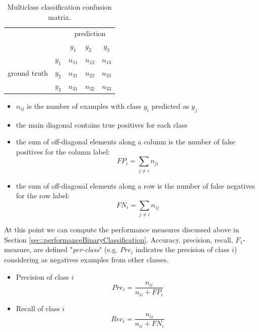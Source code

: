 \begin{table}[ht]
    \centering
    \begin{tabular}{cc|clc|}
    \cline{3-5}
     &  & \multicolumn{3}{c|}{prediction} \\ \cline{3-5} 
     &  & \multicolumn{1}{c|}{$y_1$} & \multicolumn{1}{l|}{$y_2$} & $y_3$ \\ \hline
    \multicolumn{1}{|c|}{\multirow{3}{*}{ground truth}} & $y_1$ & \multicolumn{1}{c|}{$n_{11}$} & \multicolumn{1}{l|}{$n_{12}$} & $n_{13}$ \\ \cline{2-5} 
    \multicolumn{1}{|c|}{} & \multicolumn{1}{l|}{$y_2$} & \multicolumn{1}{l|}{$n_{21}$} & \multicolumn{1}{l|}{$n_{22}$} & \multicolumn{1}{l|}{$n_{23}$} \\ \cline{2-5} 
    \multicolumn{1}{|c|}{} & $y_3$ & \multicolumn{1}{c|}{$n_{31}$} & \multicolumn{1}{l|}{$n_{32}$} & $n_{33}$ \\ \hline
    \end{tabular}
    \caption{Multiclass classification confusion matrix.}
    \label{fig:confisionMatrixMulticlassClassification}
\end{table}


\begin{itemize}
    \item $n_{ij}$ is the number of examples with class $y_i$ predicted as $y_j$
    \item the main diagonal contains true positives for each class
    \item the sum of off-diagonal elements along a column is the number of false positives for the column label:
    $$\mathit{FP}_i = \sum_{j \neq i} n_{ji}$$
    \item the sum of off-diagonal elements along a row is the number of false negatives for the row label:
    $$\mathit{FN}_i = \sum_{j \neq i} n_{ij}$$
\end{itemize}

At this point we can compute the performance measures discussed above in Section \ref{sec::performanceBinaryClassification}. Accuracy, precision, recall, $F_1$-measure, are defined "\textit{per-class}" (e.g. $\mathit{Pre}_i$ indicates the precision of class $i$) considering as negatives examples from other classes.
\begin{itemize}
    \item Precision of class $i$
    $$\textit{Pre}_i = \frac{n_{ii}}{n_{ii}+\textit{FP}_i}$$
    \item Recall of class $i$
    $$\textit{Rec}_i = \frac{n_{ii}}{n_{ii}+\mathit{FN}_i}$$
\end{itemize}

